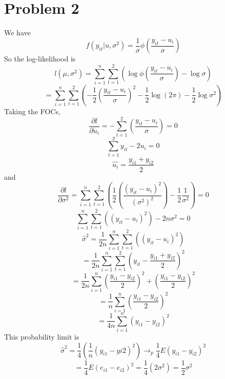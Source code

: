 \documentclass[10pt,letter]{article}
\begin{document}
\section*{Problem 2}
We have
\[ f(y_{it}|u,\sigma^2) = \frac{1}{\sigma}\phi\left(\frac{y_{it} - u_i}{\sigma} \right) \]
So the log-likelihood is
\[ l(\mu, \sigma^2) = \sum_{i=1}^n \sum_{t=1}^2 \left(\log \phi\left(\frac{y_{it} - u_i}{\sigma} \right) - \log \sigma  \right) \]
\[  = \sum_{i=1}^n \sum_{t=1}^2 \left(-\frac{1}{2}\left(\frac{y_{it} - u_i}{\sigma} \right)^2 - \frac{1}{2}\log(2\pi) - \frac{1}{2}\log \sigma^2  \right) \]
Taking the FOCs,
\[ \frac{\partial l}{\partial u_i} = - \sum_{t=1}^2 \left(\frac{y_{it} - u_i}{\sigma} \right) = 0\]
\[  \sum_{t=1}^2 y_{it} - 2u_i = 0\]
\[ \hat{u_i} = \frac{y_{i1} + y_{i2}}{2} \]
and
\[ \frac{\partial l}{\partial \sigma^2 } = \sum_{i=1}^n \sum_{t=1}^2 \left(\frac{1}{2}\left(\frac{(y_{it} - u_i)^2}{(\sigma^2)^2} \right) - \frac{1}{2}\frac{1}{\sigma^2} \right) = 0\]
\[ \sum_{i=1}^n \sum_{t=1}^2 \left((y_{it} - u_i)^2 \right) - 2n\sigma^2  = 0\]
\[ \hat{\sigma}^2 = \frac{1}{2n}\sum_{i=1}^n \sum_{t=1}^2 \left((y_{it} - u_i)^2 \right)  \]
\[ = \frac{1}{2n}\sum_{i=1}^n \sum_{t=1}^2 \left(y_{it} - \frac{y_{i1} + y_{i2}}{2}\right)^2   \]
\[ = \frac{1}{2n}\sum_{i=1}^n \left(\frac{y_{i1} - y_{i2}}{2}\right)^2 +  \left( \frac{y_{i1} - y_{i2}}{2}\right)^2  \]
\[ = \frac{1}{n}\sum_{i=1}^n \left(\frac{y_{i1} - y_{i2}}{2}\right)^2  \]
\[ = \frac{1}{4n}\sum_{i=1}^n \left(y_{i1} - y_{i2}\right)^2  \]
This probability limit is
\[ \hat{\sigma}^2 = \frac{1}{4} \left( \frac{1}{n}(y_{i1} - y{i2})^2 \right) \to_p \frac{1}{4}E(y_{i1}-y_{i2})^2 \]
\[ = \frac{1}{4}E(e_{i1}-e_{i2})^2 = \frac{1}{4}(2\sigma^2) = \frac{1}{2}\sigma^2 \]
\end{document}
